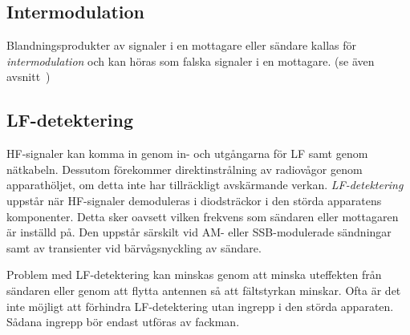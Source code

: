 \subsection{Intermodulation}

Blandningsprodukter av signaler i en mottagare eller sändare kallas för
\emph{intermodulation} och kan höras som falska signaler i en mottagare.
(se även avsnitt~)

\subsection{LF-detektering}

HF-signaler kan komma in genom in- och utgångarna för LF samt genom nätkabeln.
Dessutom förekommer direktinstrålning av radiovågor genom apparathöljet, om
detta inte har tillräckligt avskärmande verkan.
\emph{LF-detektering} uppstår när HF-signaler demoduleras i diodsträckor i den
störda apparatens komponenter.
Detta sker oavsett vilken frekvens som sändaren eller mottagaren är inställd på.
Den uppstår särskilt vid AM- eller SSB-modulerade sändningar
samt av transienter vid bärvågsnyckling av sändare.

Problem med LF-detektering kan minskas genom att minska uteffekten från sändaren
eller genom att flytta antennen så att fältstyrkan minskar.
Ofta är det inte möjligt att förhindra LF-detektering utan ingrepp i den störda
apparaten.
Sådana ingrepp bör endast utföras av fackman.
